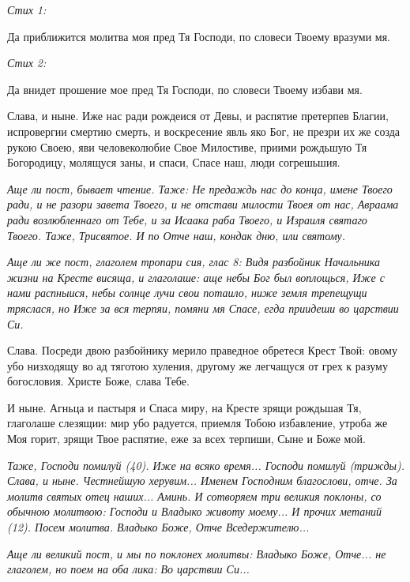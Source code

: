 \itshape Стих 1:\normalfont{}


Да приближится молитва моя пред Тя Господи, по словеси Твоему вразуми мя.


\itshape Стих 2:\normalfont{}


Да внидет прошение мое пред Тя Господи, по словеси Твоему избави мя.


Слава, и ныне. Иже нас ради рождеися от Девы, и распятие претерпев Благии, испровергии смертию смерть, и воскресение явль яко Бог, не презри их же созда рукою Своею, яви человеколюбие Свое Милостиве, приими рождьшую Тя Богородицу, молящуся заны, и спаси, Спасе наш, люди согрешьшия.


\itshape Аще ли пост, бывает чтение. Таже:\normalfont{} Не предаждь нас до конца, имене Твоего ради, и не разори завета Твоего, и не отстави милости Твоея от нас, Авраама ради возлюбленнаго от Тебе, и за Исаака раба Твоего, и Израиля святаго Твоего. Таже, Трисвятое. И по Отче наш, кондак дню, или святому.


\itshape Аще ли же пост, глаголем тропари сия, глас 8:\normalfont{} Видя разбойник Начальника жизни на Кресте висяща, и глаголаше: аще небы Бог был воплощься, Иже с нами распныися, небы солнце лучи свои потаило, ниже земля трепещущи тряслася, но Иже за вся терпяи, помяни мя Спасе, егда приидеши во царствии Си. 

Слава. Посреди двою разбойнику мерило праведное обретеся Крест Твой: овому убо низходящу во ад тяготою хуления, другому же легчащуся от грех к разуму богословия. Христе Боже, слава Тебе. 

И ныне. Агньца и пастыря и Спаса миру, на Кресте зрящи рождьшая Тя, глаголаше слезящии: мир убо радуется, приемля Тобою избавление, утроба же Моя горит, зрящи Твое распятие, еже за всех терпиши, Сыне и Боже мой. 


\itshape Таже,\normalfont{} Господи помилуй (40). Иже на всяко время... Господи помилуй (трижды). Слава, и ныне. Честнейшую херувим... Именем Господним благослови, отче. За молитв святых отец наших... Аминь. И сотворяем три великия поклоны, со обычною молитвою: Господи и Владыко животу моему... И прочих метаний (12). Посем молитва. Владыко Боже, Отче Вседержителю...


\itshape Аще ли великий пост, и мы по поклонех молитвы:\normalfont{} Владыко Боже, Отче... не глаголем, но поем на оба лика: Во царствии Си...



